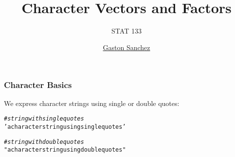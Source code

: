 \documentclass[12pt]{beamer}\usepackage[]{graphicx}\usepackage[]{color}
\title{Character Vectors and Factors}
\subtitle{STAT 133}
\author{\href{http://www.gastonsanchez.com}{Gaston Sanchez}}
\institute{\href{https://github.com/ucb-stat133/stat133-fall-2016}{\tt \scriptsize \color{foreground} github.com/ucb-stat133/stat133-fall-2016}}
\date{}
\makeatletter
\newcommand{\hlstr}[1]{\textcolor[rgb]{0.192,0.494,0.8}{#1}}%
\newcommand{\hlcom}[1]{\textcolor[rgb]{0.678,0.584,0.686}{\textit{#1}}}%
\newenvironment{kframe}{%
 \def\at@end@of@kframe{}%
 \ifinner\ifhmode%
  \def\at@end@of@kframe{\end{minipage}}%
  \begin{minipage}{\columnwidth}%
 \fi\fi%
 \def\FrameCommand##1{\hskip\@totalleftmargin \hskip-\fboxsep
 \colorbox{shadecolor}{##1}\hskip-\fboxsep
     \hskip-\linewidth \hskip-\@totalleftmargin \hskip\columnwidth}%
 \MakeFramed {\advance\hsize-\width
   \@totalleftmargin\z@ \linewidth\hsize
   \@setminipage}}%
 {\par\unskip\endMakeFramed%
 \at@end@of@kframe}
\newenvironment{knitrout}{}{} %
\makeatother
\begin{document}
{
  \frame{
    \titlepage
  } 
}


\begin{frame}
\begin{center}
\Huge{}
\end{center}
\end{frame}


\begin{frame}[fragile]
\frametitle{Character Basics}

We express character strings using single or double quotes:
\begin{knitrout}\footnotesize
{}\color{fgcolor}\begin{kframe}
\begin{alltt}
\hlcom{# string with single quotes}
\hlstr{'a character string using single quotes'}
\end{alltt}
\end{kframe}
\end{knitrout}

\begin{knitrout}\footnotesize
{}\color{fgcolor}\begin{kframe}
\begin{alltt}
\hlcom{# string with double quotes}
\hlstr{"a character string using double quotes"}
\end{alltt}
\end{kframe}
\end{knitrout}

\end{frame}

\end{document}
